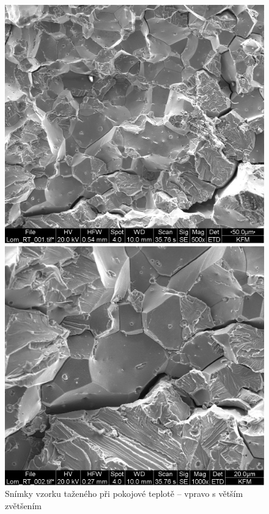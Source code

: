\begin{figure}[!h]
    \centering
    \begin{minipage}[b]{0.48\linewidth}
        \centering
        \includegraphics[width=\linewidth]{A18 - SEM/Lom_RT_001.jpg}
    \end{minipage}
    \hfill
    \begin{minipage}[b]{0.48\linewidth}
        \centering
        \includegraphics[width=\linewidth]{A18 - SEM/Lom_RT_002.jpg} %
    \end{minipage}
    \caption{Snímky vzorku taženého při pokojové teplotě – vpravo s větším zvětšením}
    \label{fig:lom_rt_combined}
\end{figure}

